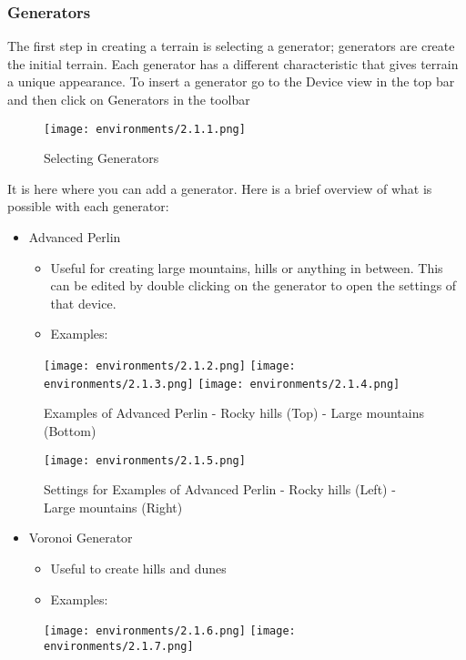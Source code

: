 \documentclass[../main.tex]{subfiles}
\begin{document}
\subsubsection{Generators}
The first step in creating a terrain is selecting a generator; generators are create the initial terrain. Each generator has a different characteristic that gives terrain a unique appearance. To insert a generator go to the Device view in the top bar and then click on Generators in the toolbar
\begin{figure}[H]
\texttt{[image: environments/2.1.1.png]}
\caption{Selecting Generators}
\end{figure}
It is here where you can add a generator.
Here is a brief overview of what is possible with each generator:
\begin{itemize}
    \item Advanced Perlin
    \begin{itemize}
        \item Useful for creating large mountains, hills or anything in between. This can be edited by double clicking on the generator to open the settings of that device.
        \item Examples:
    \end{itemize}
\end{itemize}
\begin{figure}[H]
\texttt{[image: environments/2.1.2.png]}
\texttt{[image: environments/2.1.3.png]}
\texttt{[image: environments/2.1.4.png]}
\caption{Examples of Advanced Perlin - Rocky hills (Top) - Large mountains (Bottom)}
\end{figure}
\begin{figure}[H]
\texttt{[image: environments/2.1.5.png]}
\caption{Settings for Examples of Advanced Perlin - Rocky hills (Left) - Large mountains (Right)}
\end{figure}
\begin{itemize}
    \item Voronoi Generator
    \begin{itemize}
        \item Useful to create hills and dunes
        \item Examples:
    \end{itemize}
\end{itemize}
\begin{figure}[H]
\texttt{[image: environments/2.1.6.png]}
\texttt{[image: environments/2.1.7.png]}
\end{figure}
\end{document}
